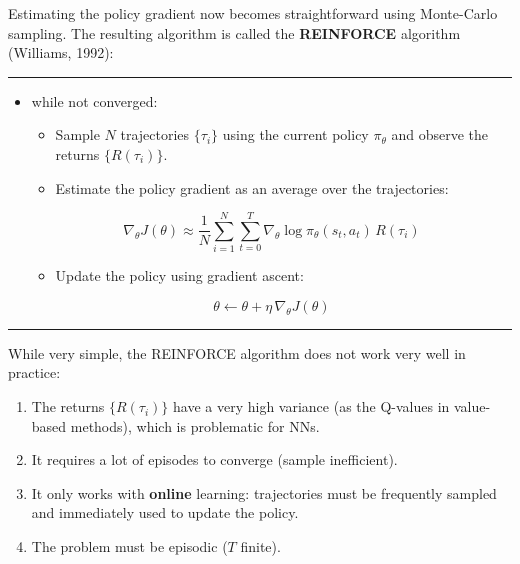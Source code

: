 \documentclass[
  letterpaper,
  DIV=11,
  numbers=noendperiod]{scrreprt}
\providecommand{\tightlist}{%
  \setlength{\itemsep}{0pt}\setlength{\parskip}{0pt}}\usepackage{longtable,booktabs,array}
\begin{document}
Estimating the policy gradient now becomes straightforward using
Monte-Carlo sampling. The resulting algorithm is called the
\textbf{REINFORCE} algorithm (Williams, 1992):

\begin{center}\rule{0.5\linewidth}{0.5pt}\end{center}

\begin{itemize}
\item
  while not converged:

  \begin{itemize}
  \item
    Sample \(N\) trajectories \(\{\tau_i\}\) using the current policy
    \(\pi_\theta\) and observe the returns \(\{R(\tau_i)\}\).
  \item
    Estimate the policy gradient as an average over the trajectories:
  \end{itemize}

  \[
       \nabla_\theta J(\theta) \approx \frac{1}{N} \sum_{i=1}^N \sum_{t=0}^T \nabla_\theta \log \pi_\theta(s_t, a_t) \, R(\tau_i)
    \]

  \begin{itemize}
  \tightlist
  \item
    Update the policy using gradient ascent:
  \end{itemize}

  \[
        \theta \leftarrow \theta + \eta \, \nabla_\theta J(\theta)
    \]
\end{itemize}

\begin{center}\rule{0.5\linewidth}{0.5pt}\end{center}

While very simple, the REINFORCE algorithm does not work very well in
practice:

\begin{enumerate}
\def\labelenumi{\arabic{enumi}.}
\tightlist
\item
  The returns \(\{R(\tau_i)\}\) have a very high variance (as the
  Q-values in value-based methods), which is problematic for NNs.
\item
  It requires a lot of episodes to converge (sample inefficient).
\item
  It only works with \textbf{online} learning: trajectories must be
  frequently sampled and immediately used to update the policy.
\item
  The problem must be episodic (\(T\) finite).
\end{enumerate}
\end{document}
